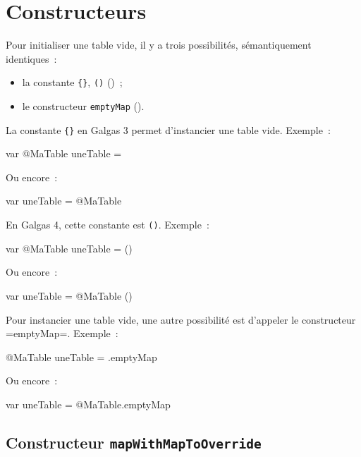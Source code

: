 \section{Constructeurs}

Pour initialiser une table vide, il y a trois possibilités, sémantiquement identiques~:
\begin{itemize}
  \item la constante \texttt{\{\}}, \texttt{()} ()~;
  \item le constructeur \texttt{emptyMap} ().
\end{itemize}



La constante \texttt{\{\}} en Galgas 3 permet d'instancier une table vide. Exemple~:
\begin{galgas3}
var @MaTable uneTable = {}
\end{galgas3}

Ou encore~:

\begin{galgas3}
var uneTable = @MaTable {}
\end{galgas3}

En Galgas 4, cette constante est \texttt{()}. Exemple~:
\begin{galgas4}
var @MaTable uneTable = ()
\end{galgas4}

Ou encore~:

\begin{galgas4}
var uneTable = @MaTable ()
\end{galgas4}





Pour instancier une table vide, une autre possibilité est d'appeler le constructeur \ggst=emptyMap=. Exemple~:
\begin{galgas3}
@MaTable uneTable = .emptyMap
\end{galgas3}

Ou encore~:

\begin{galgas3}
var uneTable = @MaTable.emptyMap
\end{galgas3}




\subsection{Constructeur \texttt{mapWithMapToOverride}}

